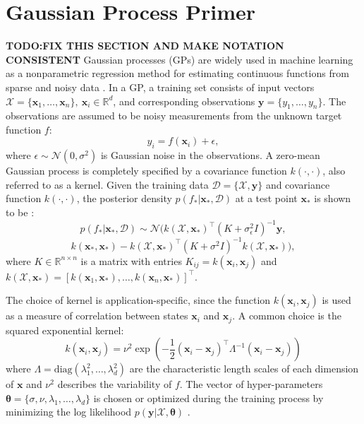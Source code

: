 \documentclass[letterpaper, 10 pt, conference]{ieeeconf}  %
\newcommand{\by}{\mathbf{y}}
\newcommand{\bx}{\mathbf{x}}
\newcommand{\mX}{\mathcal{X}}
\newcommand{\mD}{\mathcal{D}}
\newcommand{\mN}{\mathcal{N}}
\begin{document}
\section{Gaussian Process Primer}
\textbf{TODO:FIX THIS SECTION AND MAKE NOTATION CONSISTENT}
 Gaussian processes (GPs) are widely used in machine learning as a nonparametric regression method for estimating continuous functions from sparse and noisy data \cite{rasmussen2006}.
In a GP, a training set consists of input vectors $\mX = \{\bx_1, \ldots, \bx_n\}, ~\bx_i \in \mathbb{R}^d$, and corresponding observations $\by = \{y_1, \ldots, y_n\}$.
The observations are assumed to be noisy measurements from the unknown target function $f$:
\begin{equation}
y_i = f(\bx_i) + \epsilon,
\end{equation}
where $\epsilon \sim \mN(0,\sigma^2)$ is Gaussian noise in the observations.
A zero-mean Gaussian process is completely specified by a covariance function $k(\cdot,\cdot)$, also referred to as a kernel.
Given the training data $\mD = \{\mX, \by\}$ and covariance function $k(\cdot,\cdot)$, the posterior density $p(f_*|\bx_*,\mD)$ at a test point $\bx_{*}$ is shown to be \cite{rasmussen2006}:
\begin{equation}
  p(f_*|\bx_*,\mD) 
  \sim 
  \mN\big(k(\mX,\bx_*)^{\intercal}(K + \sigma_{\epsilon}^2I)^{-1}\by,
\end{equation}
\[
  k(\bx_*,\bx_*)-k(\mX,\bx_*)^{\intercal}(K+\sigma^2I)^{-1}k(\mX,\bx_*)\big), \label{eq:GPposterior}
\]
where $K \in \mathbb{R}^{n \times n}$ is a matrix with entries $K_{ij} = k(\bx_i,\bx_j)$ and $k(\mX,\bx_*) = [k(\bx_1,\bx_*),\ldots,k(\bx_n,\bx_*)]^{\intercal}$. 

The choice of kernel is application-specific, since the function $k(\bx_i,\bx_j)$ is used as a measure of correlation between states $\bx_i$ and $\bx_j$.
A common choice is the squared exponential kernel:
\begin{equation}
k(\bx_i,\bx_j) 
=
\nu^2\exp(-\frac{1}{2}(\bx_i - \bx_j)^{\intercal}\Lambda^{-1}(\bx_i - \bx_j))
\end{equation}
where $\Lambda= \text{diag}(\lambda_1^2,\ldots,\lambda_d^2)$ are the characteristic length scales of each dimension of $\bx$ and $\nu^2$ describes the variability of $f$.
The vector of hyper-parameters $\boldsymbol{\theta} = \{\sigma,\nu,\lambda_1,\ldots,\lambda_d\}$ is chosen or optimized during the training process by minimizing the log likelihood $p(\by|\mX,\boldsymbol{\theta})$ \cite{rasmussen2006}.
\end{document}
